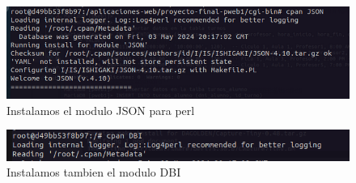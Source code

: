 \begin{figure}[H]
  \centering
  \includegraphics[width=1.0\textwidth]{img/Modulo_JSON.png}
  \caption{Instalamos el modulo JSON para perl}
\end{figure}
\begin{figure}[H]
  \centering
  \includegraphics[width=1.0\textwidth]{img/Instalador_DBI.png}
  \caption{Instalamos tambien el modulo DBI}
\end{figure}

